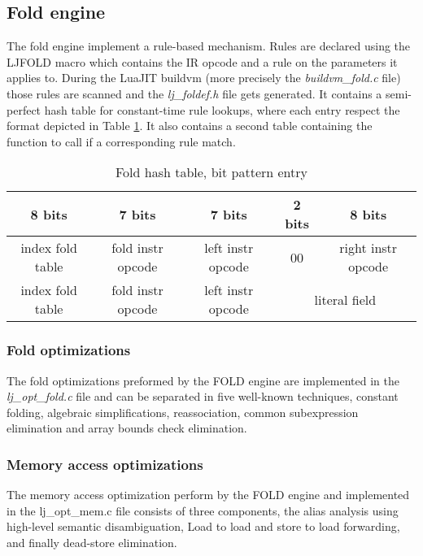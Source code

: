 
\subsection{Fold engine}
\label{Subsec:fold}

The fold engine implement a rule-based mechanism. Rules are declared using the
LJFOLD macro which contains the IR opcode and a rule on the parameters it
applies to. During the LuaJIT buildvm (more precisely the \emph{buildvm\_fold.c}
file) those rules are scanned and the \emph{lj\_foldef.h} file gets generated.
It contains a semi-perfect hash table for constant-time rule lookups, where each
entry respect the format depicted in Table \ref{tab:fold-format}. It also
contains a second table containing the function to call if a corresponding rule
match.

\begin{table}[H]
\centering
\caption{Fold hash table, bit pattern entry}
\label{tab:fold-format}
\begin{tabular}{|c|c|c|c|c|}
\hline
8 bits           & 7 bits            & 7 bits            & 2 bits   & 8 bits                      \\ \hline
index fold table & fold instr opcode & left instr opcode & 00       & right instr opcode      \\ \hline
index fold table & fold instr opcode & left instr opcode & \multicolumn{2}{c|}{literal field} \\ \hline
\end{tabular}
\end{table}

\subsubsection{Fold optimizations}
\label{Subsubsec:fold}

The fold optimizations preformed by the FOLD engine are implemented in the
\emph{lj\_opt\_fold.c} file and can be separated in five well-known techniques,
constant folding, algebraic simplifications, reassociation, common subexpression
elimination and array bounds check elimination.

\subsubsection{Memory access optimizations}
\label{Subsubsec:mao}

The memory access optimization perform by the FOLD engine and implemented
in the lj\_opt\_mem.c file consists of three components, the alias
analysis using high-level semantic disambiguation, Load to load and store to load
forwarding, and finally dead-store elimination.
